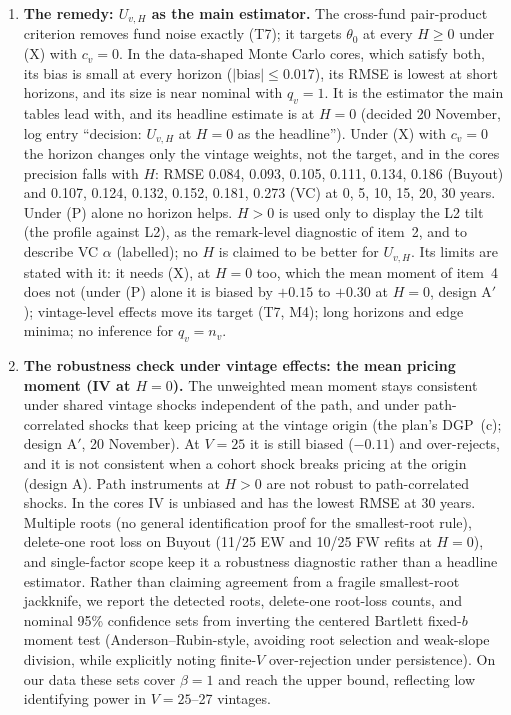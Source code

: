 \documentclass[11pt]{article}
\begin{document}
\begin{enumerate}
\item \textbf{The remedy: $U_{v,H}$ as the main estimator.} The cross-fund pair-product criterion removes fund noise exactly (T7); it targets $\theta_0$ at every $H\ge0$ under (X) with $c_v=0$. In the data-shaped Monte Carlo cores, which satisfy both, its bias is small at every horizon ($|$bias$|\le0.017$), its RMSE is lowest at short horizons, and its size is near nominal with $q_v=1$. It is the estimator the main tables lead with, and its headline estimate is at $H=0$ (decided 20 November, log entry ``decision: $U_{v,H}$ at $H=0$ as the headline''). Under (X) with $c_v=0$ the horizon changes only the vintage weights, not the target, and in the cores precision falls with $H$: RMSE 0.084, 0.093, 0.105, 0.111, 0.134, 0.186 (Buyout) and 0.107, 0.124, 0.132, 0.152, 0.181, 0.273 (VC) at 0, 5, 10, 15, 20, 30 years. Under (P) alone no horizon helps. $H>0$ is used only to display the L2 tilt (the profile against L2), as the remark-level diagnostic of item~2, and to describe VC $\alpha$ (labelled); no $H$ is claimed to be better for $U_{v,H}$. Its limits are stated with it: it needs (X), at $H=0$ too, which the mean moment of item~4 does not (under (P) alone it is biased by $+0.15$ to $+0.30$ at $H=0$, design A$'$); vintage-level effects move its target (T7, M4); long horizons and edge minima; no inference for $q_v=n_v$.
\item \textbf{The robustness check under vintage effects: the mean pricing moment (IV at $H=0$).} The unweighted mean moment stays consistent under shared vintage shocks independent of the path, and under path-correlated shocks that keep pricing at the vintage origin (the plan's DGP~(c); design A$'$, 20 November). At $V=25$ it is still biased ($-0.11$) and over-rejects, and it is not consistent when a cohort shock breaks pricing at the origin (design A). Path instruments at $H>0$ are not robust to path-correlated shocks. In the cores IV is unbiased and has the lowest RMSE at 30 years. Multiple roots (no general identification proof for the smallest-root rule), delete-one root loss on Buyout (11/25 EW and 10/25 FW refits at $H=0$), and single-factor scope keep it a robustness diagnostic rather than a headline estimator. Rather than claiming agreement from a fragile smallest-root jackknife, we report the detected roots, delete-one root-loss counts, and nominal 95\% confidence sets from inverting the centered Bartlett fixed-$b$ moment test (Anderson--Rubin-style, avoiding root selection and weak-slope division, while explicitly noting finite-$V$ over-rejection under persistence). On our data these sets cover $\beta=1$ and reach the upper bound, reflecting low identifying power in $V=25$--27 vintages.

\end{enumerate}
\end{document}
